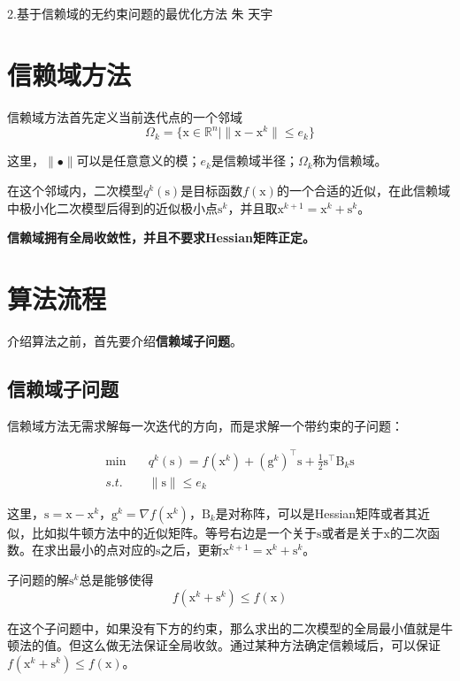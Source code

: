 \documentclass[a4paper]{D:/repositories/MyDGP/latex/PaperReadingLog}
\begin{document}
\PaperInfo
{2.基于信赖域的无约束问题的最优化方法}
{朱}
{天宇}
{}

\section{信赖域方法}
信赖域方法首先定义当前迭代点的一个邻域
$$
\Omega_k=\{\mathrm{x}\in\mathbb{R}^n | \lVert \mathrm{x}-\mathrm{x}^k \lVert \le e_k \}
$$

这里，$\lVert \bullet \lVert$可以是任意意义的模；$e_k$是信赖域半径；$\Omega_k$称为信赖域。

在这个邻域内，二次模型$q^k(\mathrm{s})$是目标函数$f(\mathrm{x})$的一个合适的近似，在此信赖域中极小化二次模型后得到的近似极小点$\mathrm{s}^k$，并且取$\mathrm{x}^{k+1}=\mathrm{x}^k+\mathrm{s}^k$。

\textbf{信赖域拥有全局收敛性，并且不要求Hessian矩阵正定。}

\section{算法流程}

介绍算法之前，首先要介绍\textbf{信赖域子问题}。

\subsection{信赖域子问题}
信赖域方法无需求解每一次迭代的方向，而是求解一个带约束的子问题：

$$
\begin{aligned}
    \min&\quad q^k(\mathrm{s})=f(\mathrm{x}^k)+(\mathrm{g}^k)^\top\mathrm{s}+\frac{1}{2}\mathrm{s}^\top\mathrm{B}_k\mathrm{s}\\
    s.t.&\quad \lVert \mathrm{s} \lVert\le e_k
\end{aligned}
$$

这里，$\mathrm{s}=\mathrm{x}-\mathrm{x}^k$，$\mathrm{g}^k=\nabla f(\mathrm{x}^k)$，$\mathrm{B}_k$是对称阵，可以是Hessian矩阵或者其近似，比如拟牛顿方法中的近似矩阵。等号右边是一个关于$\mathrm{s}$或者是关于$\mathrm{x}$的二次函数。在求出最小的点对应的$\mathrm{s}$之后，更新$\mathrm{x}^{k+1}=\mathrm{x}^k+\mathrm{s}^k$。

子问题的解$\mathrm{s}^k$总是能够使得
$$
f(\mathrm{x}^k+\mathrm{s}^k)\le f(\mathrm{x})
$$

在这个子问题中，如果没有下方的约束，那么求出的二次模型的全局最小值就是牛顿法的值。但这么做无法保证全局收敛。通过某种方法确定信赖域后，可以保证$f(\mathrm{x}^k+\mathrm{s}^k)\le f(\mathrm{x})$。
\end{document}
